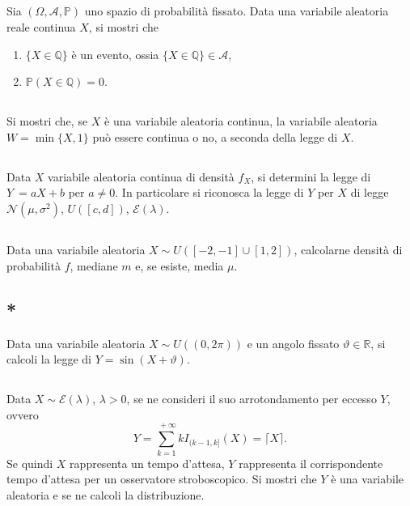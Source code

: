 \subsection{}

Sia $( \Omega ,\mathcal{A} ,\mathbb{P})$ uno spazio di probabilità fissato. Data una variabile aleatoria reale continua $X$, si mostri che
\begin{enumerate}
\item $\{X\in \mathbb{Q}\}$ è un evento, ossia $\{X\in \mathbb{Q}\} \in \mathcal{A}$,
\item $\mathbb{P}( X\in \mathbb{Q}) =0$.
\end{enumerate}
\subsection{}

Si mostri che, se $X$ è una variabile aleatoria continua, la variabile aleatoria $W=\min\{X,1\}$ può essere continua o no, a seconda della legge di $X$.
\subsection{}

Data $X$ variabile aleatoria continua di densità $f_{X}$, si determini la legge di $Y\ =aX+b$ per $a\neq 0$. In particolare si riconosca la legge di $Y$ per $X$ di legge $\mathcal{N}\left( \mu ,\sigma ^{2}\right)$, $U([ c,d])$, $\mathcal{E}( \lambda )$.
\subsection{}

Data una variabile aleatoria $X\sim U([ -2,-1] \cup [ 1,2])$, calcolarne densità di probabilità $f$, mediane $m$ e, se esiste, media $\mu $.
\subsection{*}

Data una variabile aleatoria $X\sim U(( 0,2\pi ))$ e un angolo fissato $\vartheta \in \mathbb{R}$, si calcoli la legge di $Y=\sin( X+\vartheta )$.
\subsection{}

Data $X\sim \mathcal{E}( \lambda )$, $\lambda  >0$, se ne consideri il suo arrotondamento per eccesso $Y$, ovvero
\begin{equation*}
Y=\sum\limits _{k=1}^{\ +\infty } kI_{( k-1,k]}( X) =\lceil X\rceil .
\end{equation*}
Se quindi $X$ rappresenta un tempo d'attesa, $Y$ rappresenta il corrispondente tempo d'attesa per un osservatore stroboscopico. Si mostri che $Y$ è una variabile aleatoria e se ne calcoli la distribuzione.
